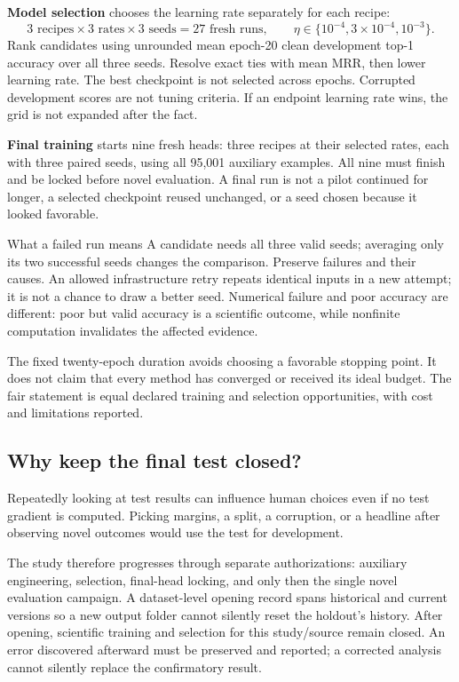 \textbf{Model selection} chooses the learning rate separately for each recipe:
\[
 3\text{ recipes}\times3\text{ rates}\times3\text{ seeds}=27\text{ fresh runs},
 \qquad\eta\in\{10^{-4},3\times10^{-4},10^{-3}\}.
\]
Rank candidates using unrounded mean epoch-20 clean development top-1 accuracy
over all three seeds. Resolve exact ties with mean MRR, then lower learning rate.
The best checkpoint is not selected across epochs. Corrupted development scores
are not tuning criteria. If an endpoint learning rate wins, the grid is not
expanded after the fact.

\textbf{Final training} starts nine fresh heads: three recipes at their selected
rates, each with three paired seeds, using all 95,001 auxiliary examples. All nine
must finish and be locked before novel evaluation. A final run is not a pilot
continued for longer, a selected checkpoint reused unchanged, or a seed chosen
because it looked favorable.

\begin{concept}{What a failed run means}
A candidate needs all three valid seeds; averaging only its two successful
seeds changes the comparison. Preserve failures and their causes. An allowed
infrastructure retry repeats identical inputs in a new attempt; it is not a
chance to draw a better seed. Numerical failure and poor accuracy are different:
poor but valid accuracy is a scientific outcome, while nonfinite computation
invalidates the affected evidence.
\end{concept}

The fixed twenty-epoch duration avoids choosing a favorable stopping point.
It does not claim that every method has converged or received its ideal budget.
The fair statement is equal declared training and selection opportunities,
with cost and limitations reported.

\subsection{Why keep the final test closed?}
Repeatedly looking at test results can influence human choices even if no
test gradient is computed. Picking margins, a split, a corruption, or a headline
after observing novel outcomes would use the test for development.

The study therefore progresses through separate authorizations: auxiliary
engineering, selection, final-head locking, and only then the single novel
evaluation campaign. A dataset-level opening record spans historical and current
versions so a new output folder cannot silently reset the holdout's history.
After opening, scientific training and selection for this study/source remain
closed. An error discovered afterward must be preserved and reported; a corrected
analysis cannot silently replace the confirmatory result.

